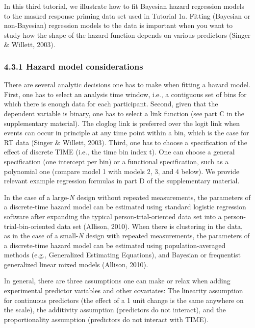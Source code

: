 \documentclass[
  man,floatsintext]{apa6}
\begin{document}
In this third tutorial, we illustrate how to fit Bayesian hazard regression models to the masked response priming data set used in Tutorial 1a. Fitting (Bayesian or non-Bayesian) regression models to the data is important when you want to study how the shape of the hazard function depends on various predictors (Singer \& Willett, 2003).

\subsubsection{4.3.1 Hazard model considerations}\label{hazard-model-considerations}

There are several analytic decisions one has to make when fitting a hazard model. First, one has to select an analysis time window, i.e., a contiguous set of bins for which there is enough data for each participant. Second, given that the dependent variable is binary, one has to select a link function (see part C in the supplementary material). The cloglog link is preferred over the logit link when events can occur in principle at any time point within a bin, which is the case for RT data (Singer \& Willett, 2003). Third, one has to choose a specification of the effect of discrete TIME (i.e., the time bin index t). One can choose a general specification (one intercept per bin) or a functional specification, such as a polynomial one (compare model 1 with models 2, 3, and 4 below). We provide relevant example regression formulas in part D of the supplementary material.

In the case of a large-\emph{N} design without repeated measurements, the parameters of a discrete-time hazard model can be estimated using standard logistic regression software after expanding the typical person-trial-oriented data set into a person-trial-bin-oriented data set (Allison, 2010). When there is clustering in the data, as in the case of a small-\emph{N} design with repeated measurements, the parameters of a discrete-time hazard model can be estimated using population-averaged methods (e.g., Generalized Estimating Equations), and Bayesian or frequentist generalized linear mixed models (Allison, 2010).

In general, there are three assumptions one can make or relax when adding experimental predictor variables and other covariates: The linearity assumption for continuous predictors (the effect of a 1 unit change is the same anywhere on the scale), the additivity assumption (predictors do not interact), and the proportionality assumption (predictors do not interact with TIME).
\end{document}
